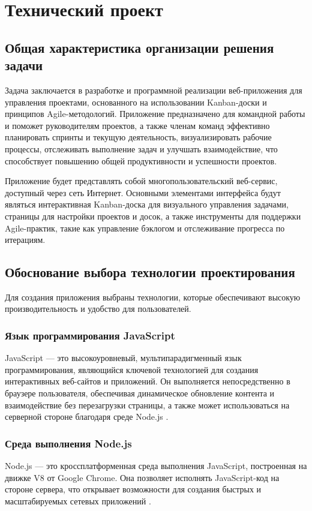 \section{Технический проект}
\subsection{Общая характеристика организации решения задачи}

Задача заключается в разработке и программной реализации веб-приложения для управления проектами, основанного на использовании Kanban-доски и принципов Agile-методологий. Приложение предназначено для командной работы и поможет руководителям проектов, а также членам команд эффективно планировать спринты и текущую деятельность, визуализировать рабочие процессы, отслеживать выполнение задач и улучшать взаимодействие, что способствует повышению общей продуктивности и успешности проектов.

Приложение будет представлять собой многопользовательский веб-сервис, доступный через сеть Интернет. Основными элементами интерфейса будут являться интерактивная Kanban-доска для визуального управления задачами, страницы для настройки проектов и досок, а также инструменты для поддержки Agile-практик, такие как управление бэклогом и отслеживание прогресса по итерациям.

\subsection{Обоснование выбора технологии проектирования}

Для создания приложения выбраны технологии, которые обеспечивают высокую производительность и удобство для пользователей.

\subsubsection{Язык программирования JavaScript}
JavaScript — это высокоуровневый, мультипарадигменный язык программирования, являющийся ключевой технологией для создания интерактивных веб-сайтов и приложений. Он выполняется непосредственно в браузере пользователя, обеспечивая динамическое обновление контента и взаимодействие без перезагрузки страницы, а также может использоваться на серверной стороне благодаря среде Node.js \cite{javascript1}.

\subsubsection{Среда выполнения Node.js}
Node.js — это кроссплатформенная среда выполнения JavaScript, построенная на движке V8 от Google Chrome. Она позволяет исполнять JavaScript-код на стороне сервера, что открывает возможности для создания быстрых и масштабируемых сетевых приложений \cite{nodejs1}.


